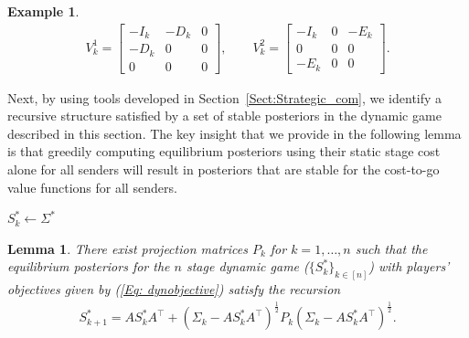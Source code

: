 \documentclass[12pt,journal,onecolumn]{IEEEtran}
\newtheorem{lemma}{Lemma}
\newtheorem{example}{Example}
\begin{document}
\begin{example}
\begin{align*}
    V_k^1=\begin{bmatrix}-I_k &-D_k&0\\-D_k&0 &0\\0 &0 &0\end{bmatrix},\qquad V_k^2=\begin{bmatrix}-I_k &0 &-E_k\\0 &0 &0\\-E_k &0 &0\end{bmatrix}.
\end{align*}
\end{example}

Next, by using tools developed in Section~\ref{Sect:Strategic_com}, we identify a recursive structure satisfied by a set of stable posteriors in the dynamic game described in this section. The key insight that we provide in the following lemma is that greedily computing equilibrium posteriors using their static stage cost alone for all senders will result in posteriors that are stable for the cost-to-go value functions for all senders.
\begin{algorithm}[t]
\caption{Finding an Equilibrium Posterior for the $m$-Sender Multi-stage Game via SDP}\label{alg: dynpostcalc}
\begin{algorithmic}
\State $S_k^*\gets\Sigma^*$
\EndFor
{}
\end{algorithmic}
\end{algorithm}
\begin{lemma}\label{lem: dynstabpost}
There exist projection matrices $P_k$ for $k=1,\hdots,n$ such that the equilibrium posteriors for the $n$ stage dynamic game ($\{S^*_k\}_{k\in[n]}$) with players' objectives given by (\ref{Eq: dynobjective}) satisfy the recursion 
\begin{align}\label{eq: dynstablepost}
    S_{k+1}^*=AS_{k}^*A^\top+(\Sigma_k-AS_k^*A^\top)^{\frac{1}{2}}P_k(\Sigma_k-AS_k^*A^\top)^{\frac{1}{2}}.
\end{align}
\end{lemma}
\end{document}
